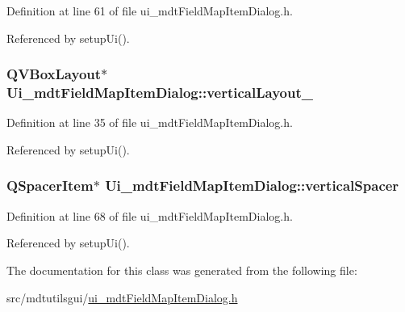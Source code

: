 Definition at line 61 of file ui\-\_\-mdt\-Field\-Map\-Item\-Dialog.\-h.



Referenced by setup\-Ui().

\hypertarget{class_ui__mdt_field_map_item_dialog_afca0cc42ef29b59402cc25568810587f}{
\subsubsection[{vertical\-Layout\-\_\-3}]{\setlength{\rightskip}{0pt plus 5cm}Q\-V\-Box\-Layout$\ast$ Ui\-\_\-mdt\-Field\-Map\-Item\-Dialog\-::vertical\-Layout\-\_}}\label{class_ui__mdt_field_map_item_dialog_afca0cc42ef29b59402cc25568810587f}


Definition at line 35 of file ui\-\_\-mdt\-Field\-Map\-Item\-Dialog.\-h.



Referenced by setup\-Ui().

\hypertarget{class_ui__mdt_field_map_item_dialog_acb7c62fcf790e211f5738c044526afa9}{
\subsubsection[{vertical\-Spacer}]{\setlength{\rightskip}{0pt plus 5cm}Q\-Spacer\-Item$\ast$ Ui\-\_\-mdt\-Field\-Map\-Item\-Dialog\-::vertical\-Spacer}}\label{class_ui__mdt_field_map_item_dialog_acb7c62fcf790e211f5738c044526afa9}


Definition at line 68 of file ui\-\_\-mdt\-Field\-Map\-Item\-Dialog.\-h.



Referenced by setup\-Ui().



The documentation for this class was generated from the following file\-:\begin{DoxyCompactItemize}
\item 
src/mdtutilsgui/\hyperlink{ui__mdt_field_map_item_dialog_8h}{ui\-\_\-mdt\-Field\-Map\-Item\-Dialog.\-h}\end{DoxyCompactItemize}
